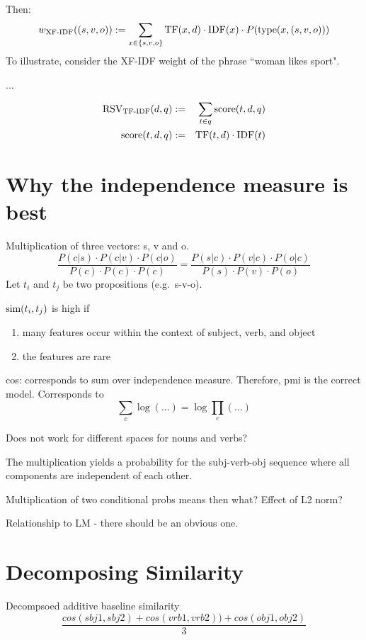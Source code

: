 Then:
\[
w_\textmd{XF-IDF}((s,v,o)) :=
\sum_{x \in \{s,v,o\}} \textmd{TF}(x,d) \cdot \textmd{IDF}(x) \cdot P(\textmd{type}(x,(s,v,o)))
\]
To illustrate, consider the XF-IDF weight of the phrase ``woman likes sport".

...

\begin{eqnarray}
\label{tf-idf-phrase}
\textmd{RSV}_\textmd{TF-IDF}(d,q) &:=& \sum_{t \in q} \textmd{score}(t,d,q)\\
\textmd{score}(t,d,q) &:=&
\textmd{TF}(t,d) \cdot \textmd{IDF}(t)
\end{eqnarray}





\section{Why the independence measure is best}

Multiplication of three vectors: s, v and o.
\[
\frac{
P(c|s) \cdot P(c|v) \cdot P(c|o)}{
P(c) \cdot P(c) \cdot P(c)} =
\frac{
P(s|c) \cdot P(v|c) \cdot P(o|c)
}{
P(s) \cdot P(v) \cdot P(o)
}
\]
Let $t_i$ and $t_j$ be two propositions
(e.g.~s-v-o).

$\textmd{sim}(t_i,t_j)$ is high if
\begin{enumerate}
\item many features occur within the context of subject, verb, and object
\item the features are rare
\end{enumerate}

cos: corresponds to sum over independence measure.
Therefore, pmi is the correct model.
Corresponds to
\[
\sum_c \log(...) = \log \prod_c(...)
\]



Does not work for different
spaces for nouns and verbs?

The multiplication yields a probability
for the subj-verb-obj sequence where all
components are independent of each other.

Multiplication of two conditional probs means then what?
Effect of L2 norm?


Relationship to LM - there should be an obvious one.


\section{Decomposing Similarity}
Decompsoed additive baseline similarity
\[
\frac{cos(sbj1,sbj2) + cos(vrb1,vrb2)) + cos(obj1,obj2)}{3}
\]

